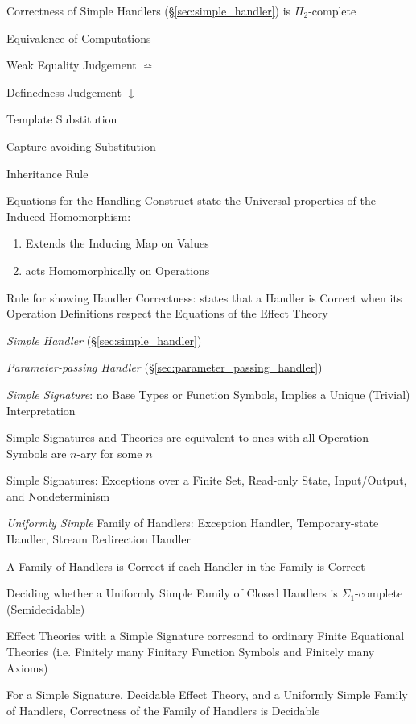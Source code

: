 Correctness of Simple Handlers (\S\ref{sec:simple_handler}) is
$\Pi_2$-complete %


\asterism


Equivalence of Computations

Weak Equality Judgement $\bumpeq$

Definedness Judgement $\downarrow$

Template Substitution

Capture-avoiding Substitution

Inheritance Rule

Equations for the Handling Construct state the Universal properties of
the Induced Homomorphism:
\begin{enumerate}
  \item Extends the Inducing Map on Values
  \item acts Homomorphically on Operations
\end{enumerate}

Rule for showing Handler Correctness: %
states that a Handler is Correct when its Operation Definitions
respect the Equations of the Effect Theory

\emph{Simple Handler} (\S\ref{sec:simple_handler})

\emph{Parameter-passing Handler}
(\S\ref{sec:parameter_passing_handler})

\emph{Simple Signature}: no Base Types or Function Symbols, Implies a
Unique (Trivial) Interpretation

Simple Signatures and Theories are equivalent to ones with all
Operation Symbols are $n$-ary for some $n$

Simple Signatures: Exceptions over a Finite Set, Read-only State,
Input/Output, and Nondeterminism

\emph{Uniformly Simple} Family of Handlers: Exception Handler,
Temporary-state Handler, Stream Redirection Handler

A Family of Handlers is Correct if each Handler in the Family is
Correct

Deciding whether a Uniformly Simple Family of Closed Handlers is
$\Sigma_1$-complete (Semidecidable) %

Effect Theories with a Simple Signature corresond to ordinary Finite
Equational Theories (i.e. Finitely many Finitary Function Symbols and
Finitely many Axioms)

For a Simple Signature, Decidable Effect Theory, and a Uniformly
Simple Family of Handlers, Correctness of the Family of Handlers is
Decidable


